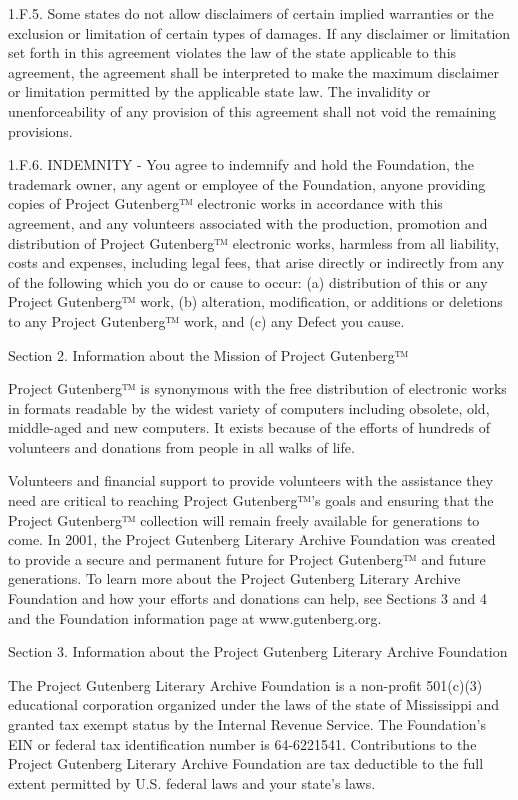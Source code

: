 1.F.5. Some states do not allow disclaimers of certain implied
warranties or the exclusion or limitation of certain types of
damages. If any disclaimer or limitation set forth in this agreement
violates the law of the state applicable to this agreement, the
agreement shall be interpreted to make the maximum disclaimer or
limitation permitted by the applicable state law. The invalidity or
unenforceability of any provision of this agreement shall not void the
remaining provisions.

1.F.6. INDEMNITY - You agree to indemnify and hold the Foundation, the
trademark owner, any agent or employee of the Foundation, anyone
providing copies of Project Gutenberg™ electronic works in
accordance with this agreement, and any volunteers associated with the
production, promotion and distribution of Project Gutenberg™
electronic works, harmless from all liability, costs and expenses,
including legal fees, that arise directly or indirectly from any of
the following which you do or cause to occur: (a) distribution of this
or any Project Gutenberg™ work, (b) alteration, modification, or
additions or deletions to any Project Gutenberg™ work, and (c) any
Defect you cause.

Section 2. Information about the Mission of Project Gutenberg™

Project Gutenberg™ is synonymous with the free distribution of
electronic works in formats readable by the widest variety of
computers including obsolete, old, middle-aged and new computers. It
exists because of the efforts of hundreds of volunteers and donations
from people in all walks of life.

Volunteers and financial support to provide volunteers with the
assistance they need are critical to reaching Project Gutenberg™’s
goals and ensuring that the Project Gutenberg™ collection will
remain freely available for generations to come. In 2001, the Project
Gutenberg Literary Archive Foundation was created to provide a secure
and permanent future for Project Gutenberg™ and future
generations. To learn more about the Project Gutenberg Literary
Archive Foundation and how your efforts and donations can help, see
Sections 3 and 4 and the Foundation information page at www.gutenberg.org.

Section 3. Information about the Project Gutenberg Literary Archive Foundation

The Project Gutenberg Literary Archive Foundation is a non-profit
501(c)(3) educational corporation organized under the laws of the
state of Mississippi and granted tax exempt status by the Internal
Revenue Service. The Foundation’s EIN or federal tax identification
number is 64-6221541. Contributions to the Project Gutenberg Literary
Archive Foundation are tax deductible to the full extent permitted by
U.S. federal laws and your state’s laws.

